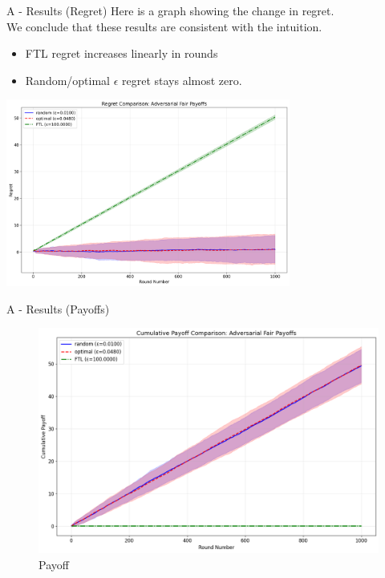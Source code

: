 \documentclass{beamer}
\begin{document}
\begin{frame}{A - Results (Regret)}
Here is a graph showing the change in regret. \\
We conclude that these results are consistent with the intuition.
\begin{itemize}
    \item FTL regret increases linearly in rounds
    \item Random/optimal $\epsilon$ regret stays almost zero.
\end{itemize}
\begin{center}
    \includegraphics[width=0.7\textwidth]{../figures/adversarial_regret_comparison.png}
\end{center}
\end{frame}


\begin{frame}{A - Results (Payoffs)}

\begin{figure}
    \centering
    \includegraphics[width=0.8\linewidth]{figures/AFR_payoff.png}
    \caption{Payoff}
    \label{fig:placeholder}
\end{figure}

\end{frame}
\end{document}
